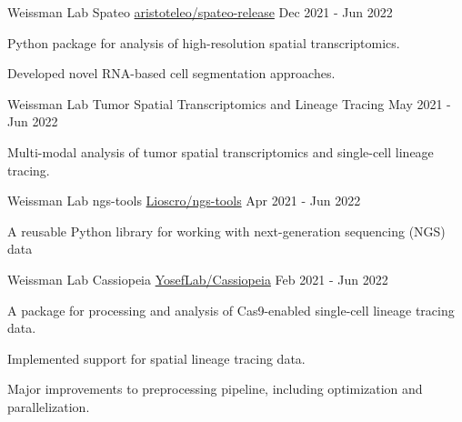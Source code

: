 

\begin{cventries}

\cventry
  {Weissman Lab} %
  {Spateo} %
  {\faGithub\phantom{a}\href{https://github.com/aristoteleo/spateo-release}{aristoteleo/spateo-release}} %
  {Dec 2021 - Jun 2022} %
  {
    \begin{cvitems} %
      \item {Python package for analysis of high-resolution spatial transcriptomics.}
      \item {Developed novel RNA-based cell segmentation approaches.}
    \end{cvitems}
  }

\cventry
  {Weissman Lab} %
  {Tumor Spatial Transcriptomics and Lineage Tracing} %
  {} %
  {May 2021 - Jun 2022} %
  {
    \begin{cvitems} %
      \item {Multi-modal analysis of tumor spatial transcriptomics and single-cell lineage tracing.}
    \end{cvitems}
  }

\cventry
  {Weissman Lab} %
  {ngs-tools} %
  {\faGithub\phantom{a}\href{https://github.com/Lioscro/ngs-tools}{Lioscro/ngs-tools}} %
  {Apr 2021 - Jun 2022} %
  {
    \begin{cvitems} %
      \item {A reusable Python library for working with next-generation sequencing (NGS) data}
    \end{cvitems}
  }


\cventry
  {Weissman Lab} %
  {Cassiopeia} %
  {\faGithub\phantom{a}\href{https://github.com/YosefLab/Cassiopeia}{YosefLab/Cassiopeia}} %
  {Feb 2021 - Jun 2022} %
  {
    \begin{cvitems} %
      \item {A package for processing and analysis of Cas9-enabled single-cell lineage tracing data.}
      \item {Implemented support for spatial lineage tracing data.}
      \item {Major improvements to preprocessing pipeline, including optimization and parallelization.}
    \end{cvitems}
  }


\end{cventries}

